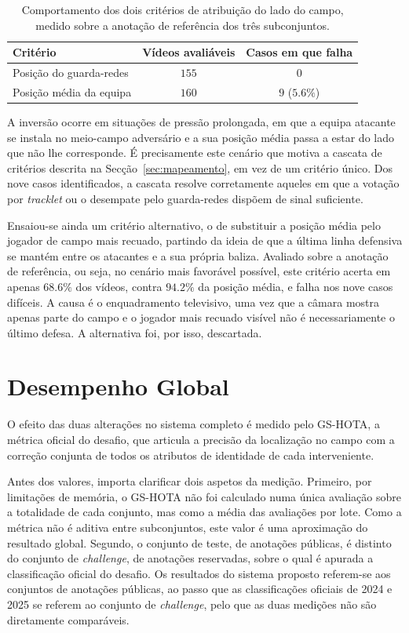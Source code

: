 \begin{table}[htbp]
    \centering
    \caption{Comportamento dos dois critérios de atribuição do lado do campo, medido sobre a
    anotação de referência dos três subconjuntos.}
    \label{tab:lado-inversoes}
    \begin{tabular}{lcc}
        \hline
        \textbf{Critério} & \textbf{Vídeos avaliáveis} & \textbf{Casos em que falha} \\
        \hline
        Posição do guarda-redes  & $155$ & $0$ \\
        Posição média da equipa  & $160$ & $9$ ($5.6\%$) \\
        \hline
    \end{tabular}
\end{table}

A inversão ocorre em situações de pressão prolongada, em que a equipa atacante se instala no
meio-campo adversário e a sua posição média passa a estar do lado que não lhe corresponde.
É precisamente este cenário que motiva a cascata de critérios descrita na
Secção~\ref{sec:mapeamento}, em vez de um critério único. Dos nove casos identificados, a
cascata resolve corretamente aqueles em que a votação por \emph{tracklet} ou o desempate
pelo guarda-redes dispõem de sinal suficiente.

Ensaiou-se ainda um critério alternativo, o de substituir a posição média pelo jogador de
campo mais recuado, partindo da ideia de que a última linha defensiva se mantém entre os
atacantes e a sua própria baliza. Avaliado sobre a anotação de referência, ou seja, no
cenário mais favorável possível, este critério acerta em apenas $68.6\%$ dos vídeos, contra
$94.2\%$ da posição média, e falha nos nove casos difíceis. A causa é o enquadramento
televisivo, uma vez que a câmara mostra apenas parte do campo e o jogador mais recuado
visível não é necessariamente o último defesa. A alternativa foi, por isso, descartada.


\section{Desempenho Global}
\label{sec:desempenho_global}

O efeito das duas alterações no sistema completo é medido pelo GS-HOTA, a métrica oficial do
desafio, que articula a precisão da localização no campo com a correção conjunta de todos os
atributos de identidade de cada interveniente.

Antes dos valores, importa clarificar dois aspetos da medição. Primeiro, por limitações de
memória, o GS-HOTA não foi calculado numa única avaliação sobre a totalidade de cada
conjunto, mas como a média das avaliações por lote. Como a métrica não é aditiva entre
subconjuntos, este valor é uma aproximação do resultado global. Segundo, o conjunto de teste,
de anotações públicas, é distinto do conjunto de \emph{challenge}, de anotações reservadas,
sobre o qual é apurada a classificação oficial do desafio. Os resultados do sistema proposto
referem-se aos conjuntos de anotações públicas, ao passo que as classificações oficiais de
2024 e 2025 se referem ao conjunto de \emph{challenge}, pelo que as duas medições não são
diretamente comparáveis.

